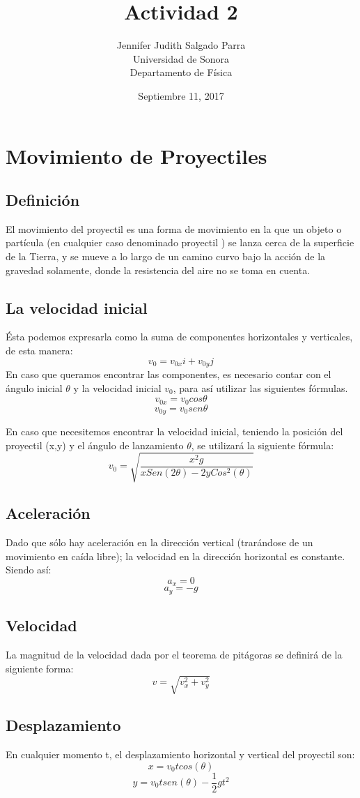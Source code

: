 \documentclass{article}
\title{Actividad 2}
\author{Jennifer Judith Salgado Parra \\ Universidad de Sonora\\ Departamento de Física \\}
\date {Septiembre 11, 2017}
\begin{document}
\maketitle
\section{Movimiento de Proyectiles}

\subsection {Definición}
El movimiento del proyectil es una forma de movimiento en la que un objeto o partícula (en cualquier caso denominado proyectil ) se lanza cerca de la superficie de la Tierra, y se mueve a lo largo de un camino curvo bajo la acción de la gravedad solamente, donde la resistencia del aire no se toma en cuenta.

\subsection{La velocidad inicial}
Ésta podemos expresarla como la suma de componentes horizontales y verticales, de esta manera:\[v_{0}=v_{0x}i + v_{0y}j\]
En caso que queramos encontrar las componentes, es necesario contar con el ángulo inicial \(\theta\) y la velocidad inicial \(v_{0}\), para así utilizar las siguientes fórmulas. \[v_{0x}=v_{0}cos\theta\]\[v_{0y}=v_{0}sen\theta\]

En caso que necesitemos encontrar la velocidad inicial, teniendo la posición del proyectil (x,y) y el ángulo de lanzamiento \(\theta\), se utilizará la siguiente fórmula:\[v_{0}=\sqrt{\frac{x^2g}{xSen(2\theta)-2yCos^2(\theta)}}\]

\subsection{Aceleración}
Dado que sólo hay aceleración en la dirección vertical (trarándose de un movimiento en caída libre); la velocidad en la dirección horizontal es constante. Siendo así: \[a_{x}=0\]\[a_{y}=-g\]

\subsection{Velocidad}
La magnitud de la velocidad dada por el teorema de pitágoras se definirá de la siguiente forma:
\[v={\sqrt{v^2_{x}+v^2_{y}}}\]

\subsection{Desplazamiento}
En cualquier momento t, el desplazamiento horizontal y vertical del proyectil son:\[x=v_{0} t cos(\theta)\]
\[y=v_{0} t sen(\theta)-\frac{1}{2}gt^2 \]
\end{document}
